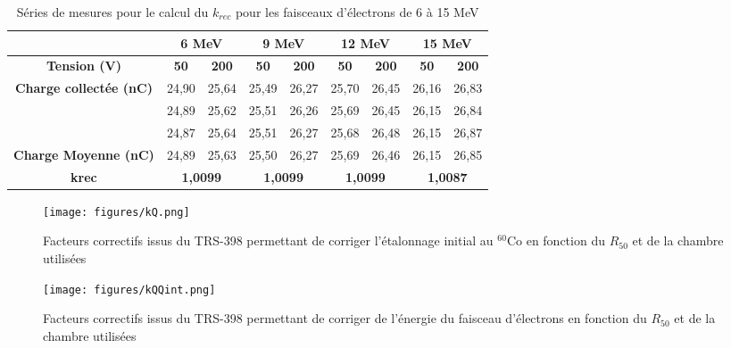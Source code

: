 \documentclass{article}
\begin{document}
\begin{table}[h]
  \centering
  \begin{tabular}{cclclclcl}
  \cline{2-9}
  \multicolumn{1}{c|}{} & \multicolumn{2}{c|}{\textbf{6 MeV}} & \multicolumn{2}{c|}{\textbf{9 MeV}} & \multicolumn{2}{c|}{\textbf{12 MeV}} & \multicolumn{2}{c|}{\textbf{15 MeV}} \\ \hline
  \multicolumn{1}{|c|}{\textbf{Tension (V)}} & \textbf{50} & \multicolumn{1}{c|}{\textbf{200}} & \textbf{50} & \multicolumn{1}{c|}{\textbf{200}} & \textbf{50} & \multicolumn{1}{c|}{\textbf{200}} & \textbf{50} & \multicolumn{1}{c|}{\textbf{200}} \\ \hline
  \multicolumn{1}{|c|}{\multirow{3}{*}{\textbf{Charge collectée (nC)}}} & 24,90 & \multicolumn{1}{c|}{25,64} & 25,49 & \multicolumn{1}{c|}{26,27} & 25,70 & \multicolumn{1}{c|}{26,45} & 26,16 & \multicolumn{1}{c|}{26,83} \\
  \multicolumn{1}{|c|}{} & 24,89 & \multicolumn{1}{c|}{25,62} & 25,51 & \multicolumn{1}{c|}{26,26} & 25,69 & \multicolumn{1}{c|}{26,45} & 26,15 & \multicolumn{1}{c|}{26,84} \\
  \multicolumn{1}{|c|}{} & 24,87 & \multicolumn{1}{c|}{25,64} & 25,51 & \multicolumn{1}{c|}{26,27} & 25,68 & \multicolumn{1}{c|}{26,48} & 26,15 & \multicolumn{1}{c|}{26,87} \\ \hline
  \multicolumn{1}{|c|}{\textbf{Charge Moyenne (nC)}} & 24,89 & \multicolumn{1}{c|}{25,63} & 25,50 & \multicolumn{1}{c|}{26,27} & 25,69 & \multicolumn{1}{c|}{26,46} & 26,15 & \multicolumn{1}{c|}{26,85} \\ \hline
  \multicolumn{1}{|c|}{\textbf{krec}} & \multicolumn{2}{c|}{\textbf{1,0099}} & \multicolumn{2}{c|}{\textbf{1,0099}} & \multicolumn{2}{c|}{\textbf{1,0099}} & \multicolumn{2}{c|}{\textbf{1,0087}} \\ \hline
  \end{tabular}
  \caption[short]{Séries de mesures pour le calcul du $k_{rec}$ pour les faisceaux d'électrons de 6 à 15 MeV}
\end{table}

\newpage
\begin{figure}[h]
  \centering
  \texttt{[image: figures/kQ.png]}
  \caption{Facteurs correctifs issus du TRS-398 permettant de corriger l'étalonnage initial au $^{60}$Co en fonction du $R_{50}$ et de la chambre utilisées}
  \label{fig_kQ_TRS}
\end{figure}

\begin{figure}[h]
  \centering
  \texttt{[image: figures/kQQint.png]}
  \caption{Facteurs correctifs issus du TRS-398 permettant de corriger de l'énergie du faisceau d'électrons en fonction du $R_{50}$ et de la chambre utilisées}
  \label{fig_kQQint_TRS}
\end{figure}
\end{document}
